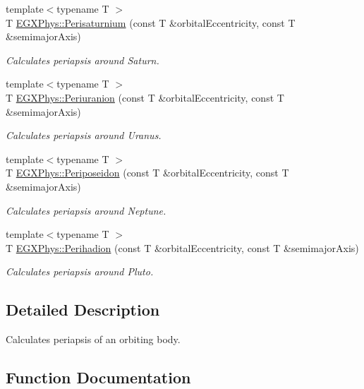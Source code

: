 \begin{DoxyCompactItemize}
{\footnotesize template$<$typename T $>$ }\\T \mbox{\hyperlink{group___e_g_x_phys-_periapsis_ga60a50d09d29ebe47cbbfc125c2ea42bf}{E\+G\+X\+Phys\+::\+Perisaturnium}} (const T \&orbital\+Eccentricity, const T \&semimajor\+Axis)
\begin{DoxyCompactList}\small\item\em Calculates periapsis around Saturn. \end{DoxyCompactList}\item 
{\footnotesize template$<$typename T $>$ }\\T \mbox{\hyperlink{group___e_g_x_phys-_periapsis_gab8b8131a617dd2d2a4de1d48accd7442}{E\+G\+X\+Phys\+::\+Periuranion}} (const T \&orbital\+Eccentricity, const T \&semimajor\+Axis)
\begin{DoxyCompactList}\small\item\em Calculates periapsis around Uranus. \end{DoxyCompactList}\item 
{\footnotesize template$<$typename T $>$ }\\T \mbox{\hyperlink{group___e_g_x_phys-_periapsis_ga237e7af3794202c67e65f64f4c8abc2a}{E\+G\+X\+Phys\+::\+Periposeidon}} (const T \&orbital\+Eccentricity, const T \&semimajor\+Axis)
\begin{DoxyCompactList}\small\item\em Calculates periapsis around Neptune. \end{DoxyCompactList}\item 
{\footnotesize template$<$typename T $>$ }\\T \mbox{\hyperlink{group___e_g_x_phys-_periapsis_gafb16e46e55078b38604eef0d7c7c40c4}{E\+G\+X\+Phys\+::\+Perihadion}} (const T \&orbital\+Eccentricity, const T \&semimajor\+Axis)
\begin{DoxyCompactList}\small\item\em Calculates periapsis around Pluto. \end{DoxyCompactList}\end{DoxyCompactItemize}


\subsection{Detailed Description}
Calculates periapsis of an orbiting body. 

\subsection{Function Documentation}
\mbox{\label{group___e_g_x_phys-_periapsis_ga4414ac75539371ec874a3d25cad6c9fe}} 
